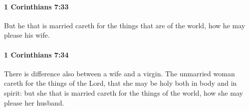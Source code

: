 		\paragraph{1 Corinthians 7:33} %
			\label{1CORINTHIANS-7-33}

			But he that is married careth for the things that are of the world, how he may please his wife.

			\begin{framed}
			\scriptsize
				\begin{compactdesc}
					\item[SBLG] 
				\end{compactdesc}
			\end{framed}

		\paragraph{1 Corinthians 7:34} %
			\label{1CORINTHIANS-7-34}

			There is difference also between a wife and a virgin.  The unmarried woman careth for the things of the Lord, that she may be holy both in body and in spirit: but she that is married careth for the things of the world, how she may please her husband.

